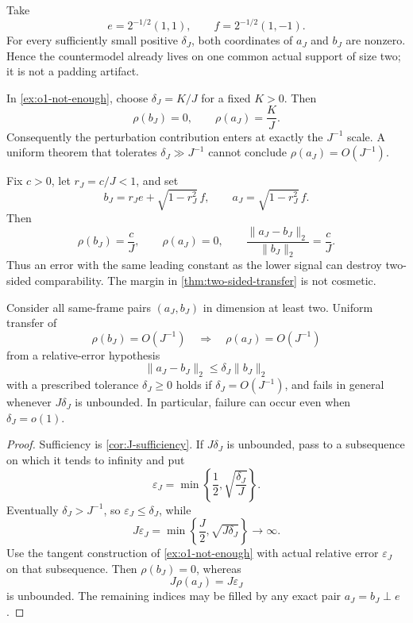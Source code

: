 \begin{remark}
Take
\[
 e=2^{-1/2}(1,1),\qquad
 f=2^{-1/2}(1,-1).
\]
For every sufficiently small positive \(\delta_J\), both coordinates
of \(a_J\) and \(b_J\) are nonzero.  Hence the countermodel already
lives on one common actual support of size two; it is not a padding
artifact.
\end{remark}

\begin{example}
\label{ex:J-sharp-order}
In \cref{ex:o1-not-enough}, choose \(\delta_J=K/J\) for a fixed
\(K>0\).  Then
\[
 \rho(b_J)=0,\qquad
 \rho(a_J)=\frac{K}{J}.
\]
Consequently the perturbation contribution enters at exactly the
\(J^{-1}\) scale.  A uniform theorem that tolerates
\(\delta_J\gg J^{-1}\) cannot conclude
\(\rho(a_J)=O(J^{-1})\).
\end{example}

\begin{example}
\label{ex:lower-signal-erased}
Fix \(c>0\), let \(r_J=c/J<1\), and set
\[
 b_J=r_Je+\sqrt{1-r_J^2}\,f,\qquad
 a_J=\sqrt{1-r_J^2}\,f.
\]
Then
\[
 \rho(b_J)=\frac{c}{J},\qquad
 \rho(a_J)=0,\qquad
 \frac{\|a_J-b_J\|_2}{\|b_J\|_2}
 =\frac{c}{J}.
\]
Thus an error with the same leading constant as the lower signal can
destroy two-sided comparability.  The margin in
\cref{thm:two-sided-transfer} is not cosmetic.
\end{example}

\begin{theorem}
\label{thm:sharp-accuracy-barrier}
Consider all same-frame pairs \((a_J,b_J)\) in dimension at least
two.  Uniform transfer of
\[
 \rho(b_J)=O(J^{-1})
 \quad\Longrightarrow\quad
 \rho(a_J)=O(J^{-1})
\]
from a relative-error hypothesis
\[
 \|a_J-b_J\|_2\le\delta_J\|b_J\|_2
\]
with a prescribed tolerance \(\delta_J\ge0\) holds if
\(\delta_J=O(J^{-1})\), and fails in general whenever
\(J\delta_J\) is unbounded.  In particular, failure can occur even
when \(\delta_J=o(1)\).
\end{theorem}

\begin{proof}
Sufficiency is \cref{cor:J-sufficiency}.  If
\(J\delta_J\) is unbounded, pass to a subsequence on which it tends
to infinity and put
\[
 \varepsilon_J
 =
 \min\left\{\frac12,\sqrt{\frac{\delta_J}{J}}\right\}.
\]
Eventually \(\delta_J>J^{-1}\), so
\(\varepsilon_J\le\delta_J\), while
\[
 J\varepsilon_J
 =
 \min\left\{\frac J2,\sqrt{J\delta_J}\right\}
 \longrightarrow\infty.
\]
Use the tangent construction of \cref{ex:o1-not-enough} with actual
relative error \(\varepsilon_J\) on that subsequence.  Then
\(\rho(b_J)=0\), whereas
\[
 J\rho(a_J)=J\varepsilon_J
\]
is unbounded.  The remaining indices may be filled by any exact
pair \(a_J=b_J\perp e\).
\end{proof}


